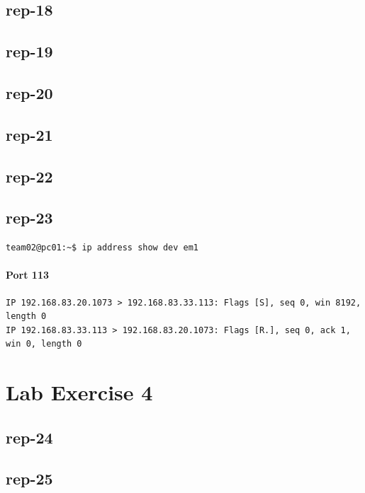 \documentclass{article}
\begin{document}
\subsection{rep-18}

\subsection{rep-19}

\subsection{rep-20}

\subsection{rep-21}
\subsection{rep-22}
\subsection{rep-23}

\begin{lstlisting}[label=listing:ip-command,caption={Command used to obtain IP address}]
team02@pc01:~$ ip address show dev em1
\end{lstlisting}

\paragraph{Port 113}
\begin{Verbatim}
IP 192.168.83.20.1073 > 192.168.83.33.113: Flags [S], seq 0, win 8192, length 0
IP 192.168.83.33.113 > 192.168.83.20.1073: Flags [R.], seq 0, ack 1, win 0, length 0
\end{Verbatim}

\section{Lab Exercise 4}

\subsection{rep-24}
\subsection{rep-25}
\end{document}
